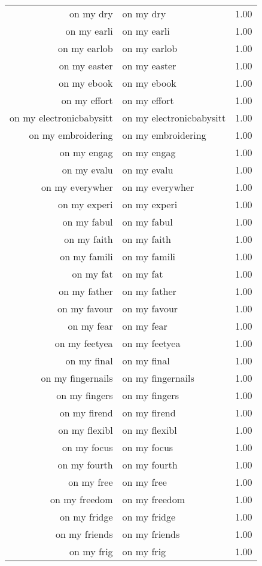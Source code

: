 \begin{table}[ht]
\begin{tabular}{rlr}
  on my dry & on my dry & 1.00 \\ 
  on my earli & on my earli & 1.00 \\ 
  on my earlob & on my earlob & 1.00 \\ 
  on my easter & on my easter & 1.00 \\ 
  on my ebook & on my ebook & 1.00 \\ 
  on my effort & on my effort & 1.00 \\ 
  on my electronicbabysitt & on my electronicbabysitt & 1.00 \\ 
  on my embroidering & on my embroidering & 1.00 \\ 
  on my engag & on my engag & 1.00 \\ 
  on my evalu & on my evalu & 1.00 \\ 
  on my everywher & on my everywher & 1.00 \\ 
  on my experi & on my experi & 1.00 \\ 
  on my fabul & on my fabul & 1.00 \\ 
  on my faith & on my faith & 1.00 \\ 
  on my famili & on my famili & 1.00 \\ 
  on my fat & on my fat & 1.00 \\ 
  on my father & on my father & 1.00 \\ 
  on my favour & on my favour & 1.00 \\ 
  on my fear & on my fear & 1.00 \\ 
  on my feetyea & on my feetyea & 1.00 \\ 
  on my final & on my final & 1.00 \\ 
  on my fingernails & on my fingernails & 1.00 \\ 
  on my fingers & on my fingers & 1.00 \\ 
  on my firend & on my firend & 1.00 \\ 
  on my flexibl & on my flexibl & 1.00 \\ 
  on my focus & on my focus & 1.00 \\ 
  on my fourth & on my fourth & 1.00 \\ 
  on my free & on my free & 1.00 \\ 
  on my freedom & on my freedom & 1.00 \\ 
  on my fridge & on my fridge & 1.00 \\ 
  on my friends & on my friends & 1.00 \\ 
  on my frig & on my frig & 1.00 \\ 

\end{tabular}
\end{table}

